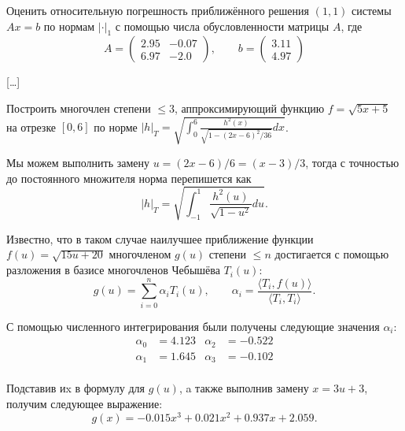 \begin{problem}
    Оценить относительную погрешность приближённого решения $(1, 1)$ системы
    $Ax = b$ по нормам $|\cdot|_1$ с помощью числа обусловленности матрицы
    $A$, где
    \begin{equation*}
        A =
        \begin{pmatrix}
            2.95 & -0.07\\
            6.97 & -2.0
        \end{pmatrix}
        , \qquad b =
        \begin{pmatrix}
            3.11\\
            4.97
        \end{pmatrix}
    \end{equation*}
\end{problem}

[\ldots]


\newpage
\begin{problem}
    Построить многочлен степени $\leq 3$, аппроксимирующий функцию
    $f = \sqrt{5x + 5}$ на отрезке $[0, 6]$ по норме
    $|h|_T = \sqrt{\int_0^6{
        \frac{h^2(x)}{\sqrt{1 - (2x - 6)^2/36}}
        dx
    }}$.
\end{problem}

Мы можем выполнить замену $u = (2x - 6) / 6 = (x - 3) / 3$, тогда с точностью
до постоянного множителя норма перепишется как
\begin{equation*}
    |h|_T = \sqrt{
        \int_{-1}^1 {\frac{h^2(u)}{\sqrt{1 - u^2}}du}
    }.
\end{equation*}

Известно, что в таком случае наилучшее приближение функции
$f(u) = \sqrt{15u + 20}$ многочленом
$g(u)$ степени $\leq n$ достигается с помощью разложения в базисе многочленов
Чебышёва $T_i(u)$:
\begin{equation*}
    g(u) = \sum_{i=0}^{n}{\alpha_i T_i(u)},
    \qquad
    \alpha_i = \frac{\langle T_i, f(u) \rangle} {\langle T_i, T_i \rangle}.
\end{equation*}

С помощью численного интегрирования были получены следующие значения $\alpha_i$:
\begin{align*}
    \alpha_0 &= 4.123
    &\alpha_2 &= -0.522\\
    \alpha_1 &= 1.645
    &\alpha_3 &= -0.102\\
\end{align*}

Подставив иx в формулу для $g(u)$, a также выполнив замену $x = 3u +3$, получим
следующее выражение:
\begin{equation*}
    g(x) = -0.015x^3 + 0.021x^2 + 0.937x + 2.059.
\end{equation*}

